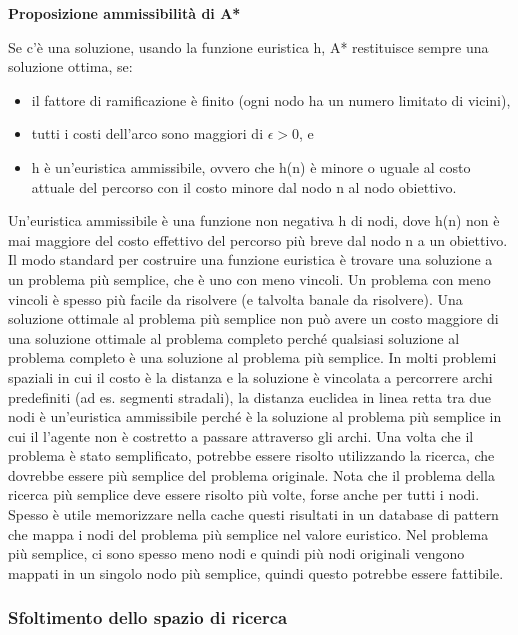 \documentclass[a4paper]{extarticle}
\begin{document}
\textbf{Proposizione ammissibilità di A*}
\begin{center}
Se c'è una soluzione, usando la funzione euristica h, A* restituisce sempre una soluzione ottima, se:
\begin{itemize}
\item il fattore di ramificazione è finito (ogni nodo ha un numero limitato di vicini),
\item tutti i costi dell'arco sono maggiori di $\epsilon >0$, e
\item h è un'euristica ammissibile, ovvero che h(n) è minore o uguale al costo attuale del percorso con il costo minore dal nodo n al nodo obiettivo.
\end{itemize}
\end{center}

Un'euristica ammissibile è una funzione non negativa h di nodi, dove h(n) non è mai maggiore del costo effettivo del percorso più breve dal nodo n a un obiettivo. Il modo standard per costruire una funzione euristica è trovare una soluzione a un problema più semplice, che è uno con meno vincoli. Un problema con meno vincoli è spesso più facile da risolvere (e talvolta banale da risolvere). Una soluzione ottimale al problema più semplice non può avere un costo maggiore di una soluzione ottimale al problema completo perché qualsiasi soluzione al problema completo è una soluzione al problema più semplice. In molti problemi spaziali in cui il costo è la distanza e la soluzione è vincolata a percorrere archi predefiniti (ad es. segmenti stradali), la distanza euclidea in linea retta tra due nodi è un'euristica ammissibile perché è la soluzione al problema più semplice in cui il l'agente non è costretto a passare attraverso gli archi.  Una volta che il problema è stato semplificato, potrebbe essere risolto utilizzando la ricerca, che dovrebbe essere più semplice del problema originale. Nota che il problema della ricerca più semplice deve essere risolto più volte, forse anche per tutti i nodi. Spesso è utile memorizzare nella cache questi risultati in un database di pattern che mappa i nodi del problema più semplice nel valore euristico. Nel problema più semplice, ci sono spesso meno nodi e quindi più nodi originali vengono mappati in un singolo nodo più semplice, quindi questo potrebbe essere fattibile.

\subsubsection{Sfoltimento dello spazio di ricerca}
\end{document}
